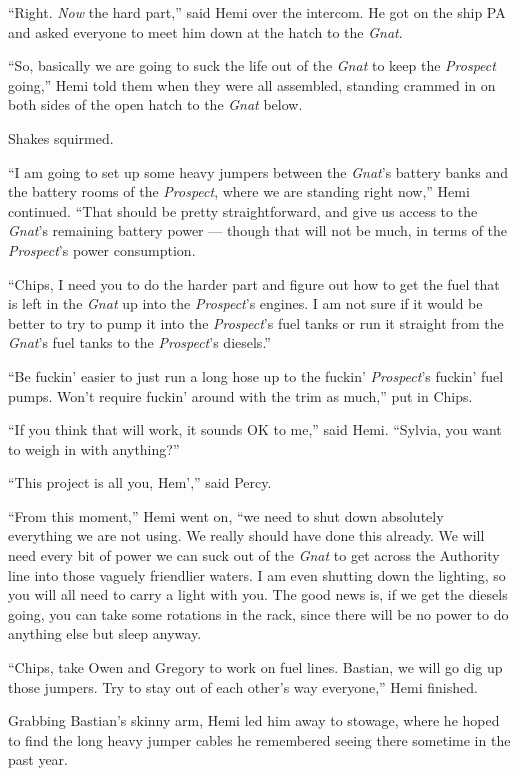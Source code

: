 \documentclass[
]{scrbook}
\begin{document}
``Right. \emph{Now} the hard part,'' said Hemi over the intercom. He got
on the ship PA and asked everyone to meet him down at the hatch to the
\emph{Gnat}.

\bigskip

``So, basically we are going to suck the life out of the \emph{Gnat} to
keep the \emph{Prospect} going,'' Hemi told them when they were all
assembled, standing crammed in on both sides of the open hatch to the
\emph{Gnat} below.

Shakes squirmed.

``I am going to set up some heavy jumpers between the \emph{Gnat}'s
battery banks and the battery rooms of the \emph{Prospect}, where we are
standing right now,'' Hemi continued. ``That should be pretty
straightforward, and give us access to the \emph{Gnat}'s remaining
battery power --- though that will not be much, in terms of the
\emph{Prospect}'s power consumption.

``Chips, I need you to do the harder part and figure out how to get the
fuel that is left in the \emph{Gnat} up into the \emph{Prospect}'s
engines. I am not sure if it would be better to try to pump it into the
\emph{Prospect}'s fuel tanks or run it straight from the \emph{Gnat}'s
fuel tanks to the \emph{Prospect}'s diesels.''

``Be fuckin' easier to just run a long hose up to the fuckin'
\emph{Prospect}'s fuckin' fuel pumps. Won't require fuckin' around with
the trim as much,'' put in Chips.

``If you think that will work, it sounds OK to me,'' said Hemi.
``Sylvia, you want to weigh in with anything?''

``This project is all you, Hem','' said Percy.

``From this moment,'' Hemi went on, ``we need to shut down absolutely
everything we are not using. We really should have done this already. We
will need every bit of power we can suck out of the \emph{Gnat} to get
across the Authority line into those vaguely friendlier waters. I am
even shutting down the lighting, so you will all need to carry a light
with you. The good news is, if we get the diesels going, you can take
some rotations in the rack, since there will be no power to do anything
else but sleep anyway.

``Chips, take Owen and Gregory to work on fuel lines. Bastian, we will
go dig up those jumpers. Try to stay out of each other's way everyone,''
Hemi finished.

Grabbing Bastian's skinny arm, Hemi led him away to stowage, where he
hoped to find the long heavy jumper cables he remembered seeing there
sometime in the past year.
\end{document}
